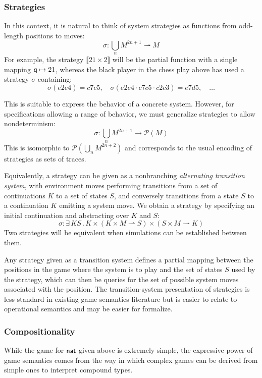 \subsubsection{Strategies}

In this context,
it is natural to think of system strategies
as functions from odd-length positions to moves:
\[ \sigma : \bigcup_n M^{2n+1} \rightharpoonup M \]
For example,
the strategy $\llbracket 21 \times 2 \rrbracket$
will be the partial function with a single mapping $ \mathsf{q}  \mapsto 21$,
whereas the black player in the chess play above
has used a strategy $\sigma$ containing:
\[
  \sigma(e2e4) = c7c5 , \quad
  \sigma(e2e4 \cdot c7c5 \cdot c2c3) = e7d5 , \quad
  \ldots
\]

This is suitable to express the behavior of a concrete system.
However, for specifications allowing a range of behavior,
we must generalize strategies to allow nondeterminism:
\[ \sigma : \bigcup_n M^{2n+1} \rightarrow \mathcal{P}(M) \]
This is isomorphic to
$\mathcal{P}(\bigcup_n M^{2n+2})$
and corresponds to the usual encoding of strategies
as sets of traces.

Equivalently,
a strategy can be given as a
nonbranching
\emph{alternating transition system},
with environment moves performing transitions from
a set of continuations $K$ to a set of states $S$,
and conversely
transitions from a state $S$ to a continuation $K$
emitting a system move.
We obtain a strategy by
specifying an initial continuation and
abstracting over $K$ and $S$:
\[ \sigma : \exists \, K S \,.\, K \times
      (K \times M \rightharpoonup S) \times
      (S \times M \rightharpoonup K) \]
Two strategies will be equivalent
when simulations can be established between them.

Any strategy given as a transition system
defines a partial mapping between the positions in the game
where the system is to play
and the set of states $S$ used by the strategy,
which can then be queries for the set of possible
system moves associated with the position.
The transition-system presentation of strategies
is less standard in existing game semantics literature
but is easier to relate to operational semantics
and may be easier for formalize.

\subsubsection{Compositionality}

While the game for $ \mathsf{nat} $ given above
is extremely simple,
the expressive power of game semantics
comes from the way in which complex games can be derived
from simple ones to interpret compound types.

